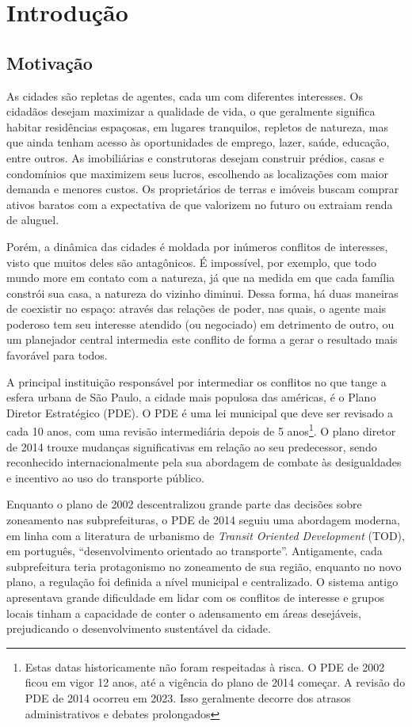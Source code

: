 \chapter{Introdução}

\section{Motivação}
\label{sec:motivacao}

As cidades são repletas de agentes, cada um com diferentes interesses. Os cidadãos desejam maximizar a qualidade de vida, o que geralmente significa habitar residências espaçosas, em lugares tranquilos, repletos de natureza, mas que ainda tenham acesso às oportunidades de emprego, lazer, saúde, educação, entre outros. As imobiliárias e construtoras desejam construir prédios, casas e condomínios que maximizem seus lucros, escolhendo as localizações com maior demanda e menores custos. Os proprietários de terras e imóveis buscam comprar ativos baratos com a expectativa de que valorizem no futuro ou extraiam renda de aluguel. 

Porém, a dinâmica das cidades é moldada por inúmeros conflitos de interesses, visto que muitos deles são antagônicos. É impossível, por exemplo, que todo mundo more em contato com a natureza, já que na medida em que cada família constrói sua casa, a natureza do vizinho diminui. Dessa forma, há duas maneiras de coexistir no espaço: através das relações de poder, nas quais, o agente mais poderoso tem seu interesse atendido (ou negociado) em detrimento de outro, ou um planejador central intermedia este conflito de forma a gerar o resultado mais favorável para todos.

A principal instituição responsável por intermediar os conflitos no que tange a esfera urbana de São Paulo, a cidade mais populosa das américas, é o Plano Diretor Estratégico (PDE). O PDE é uma lei municipal que deve ser revisado a cada 10 anos, com uma revisão intermediária depois de 5 anos\footnote{Estas datas historicamente não foram respeitadas à risca. O PDE de 2002 ficou em vigor 12 anos, até a vigência do plano de 2014 começar. A revisão do PDE de 2014 ocorreu em 2023. Isso geralmente decorre dos atrasos administrativos  e debates prolongados}. O plano diretor de 2014 trouxe mudanças significativas em relação ao seu predecessor, sendo reconhecido internacionalmente pela sua abordagem de combate às desigualdades e incentivo ao uso do transporte público.

Enquanto o plano de 2002 descentralizou grande parte das decisões sobre zoneamento nas subprefeituras, o PDE de 2014 seguiu uma abordagem moderna, em linha com a literatura de urbanismo de \textit{Transit Oriented Development} (TOD), em português, ``desenvolvimento orientado ao transporte''. Antigamente, cada subprefeitura teria protagonismo no zoneamento de sua região, enquanto no novo plano, a regulação foi definida a nível municipal e centralizado. O sistema antigo apresentava grande dificuldade em lidar com os conflitos de interesse e grupos locais tinham a capacidade de conter o adensamento em áreas desejáveis, prejudicando o desenvolvimento sustentável da cidade.

